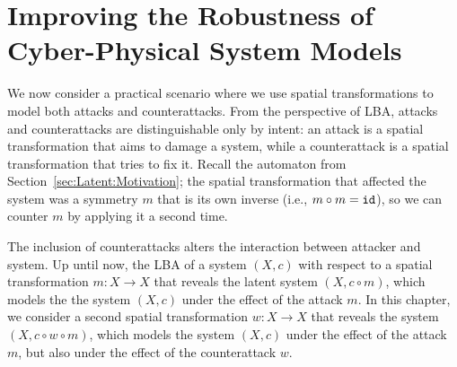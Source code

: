  \chapter{Improving the Robustness of Cyber-Physical System Models}
 \label{ch:CPSRobustness}  
 {\color{red}
 We now consider a practical scenario where we use spatial transformations to model both attacks and counterattacks. From the perspective of LBA, attacks and counterattacks are distinguishable only by intent: an attack is a spatial transformation that aims to damage a system, while a counterattack is a spatial transformation that tries to fix it. Recall the automaton from Section~\ref{sec:Latent:Motivation}; the spatial transformation that affected the system was a symmetry $m$ that is its own inverse (i.e., $m\circ m={\texttt{id}}$), so we can counter $m$ by applying it a second time. 
 
 The inclusion of counterattacks alters the interaction between attacker and system. Up until now, the LBA of a system $(X,c)$ with respect to a spatial transformation $m\colon X\rightarrow X$ that reveals the latent system $(X,c\circ m)$, which models the the system $(X,c)$ under the effect of the attack $m$. In this chapter, we consider a second spatial transformation $w\colon X\rightarrow X$ that reveals the system $(X, c\circ w\circ m)$, which models the system $(X,c)$ under the effect of the attack $m$, but also under the effect of the counterattack $w$.
 }
   
   
